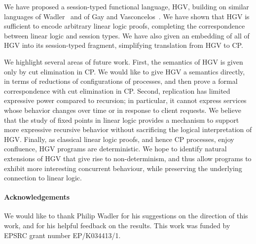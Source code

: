 \documentclass{easychair}
\newcommand{\hgv}{HGV\xspace}
\begin{document}
We have proposed a session-typed functional language, \hgv, building on similar languages of
Wadler~\cite{Wadler12} and of Gay and Vasconcelos~\cite{GayVasconcelos10}. We have shown that \hgv
is sufficient to encode arbitrary linear logic proofs, completing the correspondence between linear
logic and session types. We have also given an embedding of all of \hgv into its session-typed
fragment, simplifying translation from \hgv to CP.

We highlight several areas of future work.  First, the semantics of \hgv is given only by cut
elimination in CP. We would like to give \hgv a semantics directly, in terms of reductions of
configurations of processes, and then prove a formal correspondence with cut elimination in CP.
Second, replication has limited expressive power compared to recursion; in particular, it cannot
express services whose behavior changes over time or in response to client requests.  We believe
that the study of fixed points in linear logic provides a mechanism to support more expressive
recursive behavior without sacrificing the logical interpretation of \hgv.  Finally, as classical
linear logic proofs, and hence CP processes, enjoy confluence, \hgv programs are deterministic. We
hope to identify natural extensions of \hgv that give rise to non-determinism, and thus allow
programs to exhibit more interesting concurrent behaviour, while preserving the underlying
connection to linear logic.

\paragraph{Acknowledgements}
We would like to thank Philip Wadler for his suggestions on the direction of this work, and for his
helpful feedback on the results. This work was funded by EPSRC grant number EP/K034413/1.

\label{sect:bib}


\end{document}
